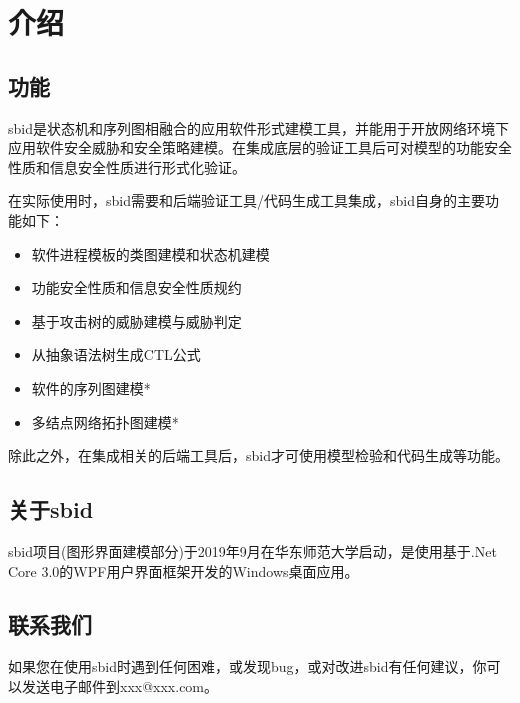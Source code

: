 \chapter{介绍}

\section{功能}
sbid是状态机和序列图相融合的应用软件形式建模工具，并能用于开放网络环境下应用软件安全威胁和安全策略建模。在集成底层的验证工具后可对模型的功能安全性质和信息安全性质进行形式化验证。
\par
在实际使用时，sbid需要和后端验证工具/代码生成工具集成，sbid自身的主要功能如下：
    \begin{itemize}
	\item{软件进程模板的类图建模和状态机建模}
	\item{功能安全性质和信息安全性质规约}
	\item{基于攻击树的威胁建模与威胁判定}
	\item{从抽象语法树生成CTL公式}
	\item{软件的序列图建模*}
	\item{多结点网络拓扑图建模*}
	\end{itemize}
\par
除此之外，在集成相关的后端工具后，sbid才可使用模型检验和代码生成等功能。

\section{关于sbid}
sbid项目(图形界面建模部分)于2019年9月在华东师范大学启动，是使用基于.Net Core 3.0的WPF用户界面框架开发的Windows桌面应用。

\section{联系我们}
如果您在使用sbid时遇到任何困难，或发现bug，或对改进sbid有任何建议，你可以发送电子邮件到xxx@xxx.com。